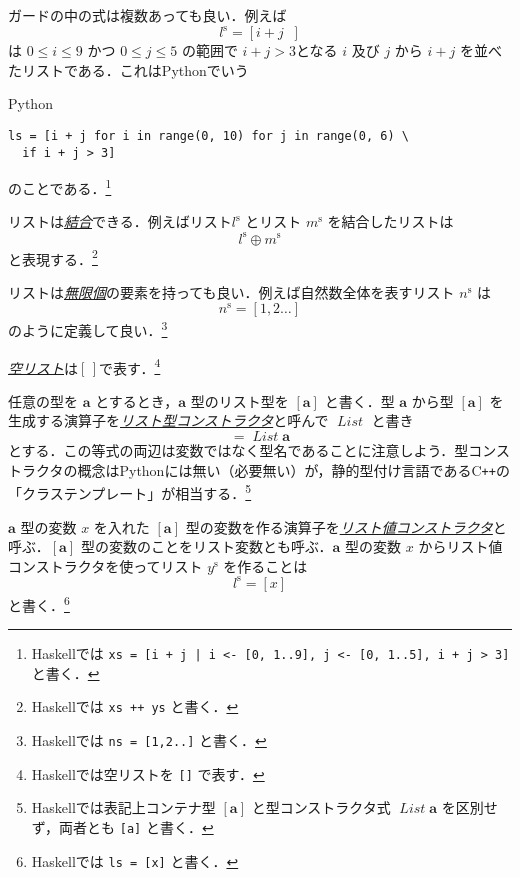 \documentclass[a4paper,draft]{jsbook}
\newcommand{\programminglanguage}[1]{\textsf{#1}}
\newcommand{\cxx}{\programminglanguage{C}\texttt{++}}
\newcommand{\haskell}{\programminglanguage{Haskell}}
\newcommand{\python}{\programminglanguage{Python}}
\newcommand{\keyword}[1]{{\underline{\emph{#1}}}}
\newcommand{\code}[1]{\texttt{#1}}
\newenvironment{pythoncode}{\begin{itembox}[r]{\python}}{\end{itembox}}
\newcommand{\mType}[1]{\mathbf{#1}}
\newcommand{\mListType}[1]{[\mType{#1}]}
\newcommand{\mTypeConstructor}[1]{\mathit{#1}} %
\newcommand{\mEmptyList}{{[\,]}}
\newcommand{\mListWith}[1]{\left[#1\right]}
\newcommand{\mList}[1]{{#1}^\mathrm{s}}
\newcommand{\mGuard}[1]{\mathop{\mid_{#1}}}
\DeclareMathOperator{\mAppend}{\oplus}
\DeclareMathOperator{\mFrom}{\in}
\DeclareMathOperator{\mListTypeConstructor}{\mTypeConstructor{List}}
\begin{document}
ガードの中の式は複数あっても良い．例えば
\begin{equation}
\mList{l}
=\mListWith{i+j\mGuard{i\mFrom\mListWith{0,1\dots9},\,j\mFrom\mListWith{0,1\dots5},\,i+j>3}}
\end{equation}
は $0\le i\le9$ かつ $0\le j\le5$ の範囲で $i+j>3$となる $i$ 及び $j$ から $i+j$ を並べたリストである．これは\python でいう
\begin{pythoncode}
\begin{verbatim}
ls = [i + j for i in range(0, 10) for j in range(0, 6) \
  if i + j > 3]
\end{verbatim}
\end{pythoncode}
のことである．\footnote{\haskell では \code{xs = [i + j | i <- [0, 1..9], j <- [0, 1..5], i + j > 3]} と書く．}

リストは\keyword{結合}できる．例えばリスト$\mList{l}$ とリスト $\mList{m}$ を結合したリストは
\begin{equation}
\mList{l}\mAppend\mList{m}
\end{equation}
と表現する．\footnote{\haskell では \code{xs ++ ys} と書く．}

リストは\keyword{無限個}の要素を持っても良い．例えば自然数全体を表すリスト $\mList{n}$ は
\begin{equation}
\mList{n}=\mListWith{1,2\dots}
\end{equation}
のように定義して良い．\footnote{\haskell では \code{ns = [1,2..]} と書く．}

\keyword{空リスト}は$\mEmptyList$で表す．\footnote{\haskell では空リストを \code{[]} で表す．}

任意の型を $\mType{a}$ とするとき，$\mType{a}$ 型のリスト型を $\mListType{a}$ と書く．型 $\mType{a}$ から型 $\mListType{a}$ を生成する演算子を\keyword{リスト型コンストラクタ}と呼んで $\mListTypeConstructor$ と書き
\begin{equation}
\mListType{a}=\mListTypeConstructor\mType{a}
\end{equation}
とする．この等式の両辺は変数ではなく型名であることに注意しよう．型コンストラクタの概念は\python には無い（必要無い）が，静的型付け言語である\cxx の「クラステンプレート」が相当する．\footnote{\haskell では表記上コンテナ型 $\mListType{a}$ と型コンストラクタ式 $\mListTypeConstructor\mType{a}$ を区別せず，両者とも \code{[a]} と書く．}

$\mType{a}$ 型の変数 $x$ を入れた $\mListType{a}$ 型の変数を作る演算子を\keyword{リスト値コンストラクタ}と呼ぶ．$\mListType{a}$ 型の変数のことをリスト変数とも呼ぶ．$\mType{a}$ 型の変数 $x$ からリスト値コンストラクタを使ってリスト $\mList{y}$ を作ることは
\begin{equation}
\mList{l}=\mListWith{x}
\end{equation}
と書く．\footnote{\haskell では \code{ls = [x]} と書く．}
\end{document}
